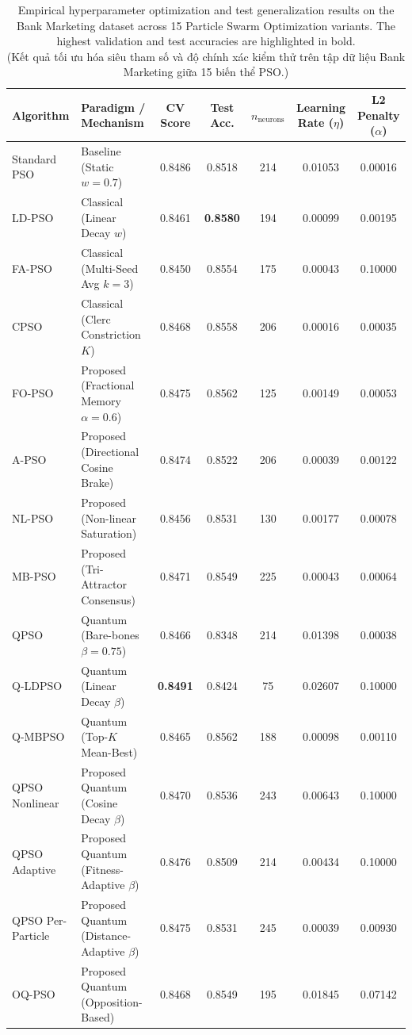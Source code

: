 \begin{table}[htbp]
\centering
\fontsize{8.5pt}{11pt}\selectfont
\caption{Empirical hyperparameter optimization and test generalization results on the Bank Marketing dataset across 15 Particle Swarm Optimization variants. The highest validation and test accuracies are highlighted in bold. \\ (Kết quả tối ưu hóa siêu tham số và độ chính xác kiểm thử trên tập dữ liệu Bank Marketing giữa 15 biến thể PSO.)}
\label{tab:bank_marketing_15algos}
\vspace{3pt}
\begin{tabular}{llccccc}
\hline\hline
\textbf{Algorithm} & \textbf{Paradigm / Mechanism} & \textbf{CV Score} & \textbf{Test Acc.} & \textbf{$n_{\mathrm{neurons}}$} & \textbf{Learning Rate ($\eta$)} & \textbf{L2 Penalty ($\alpha$)} \\
\hline
Standard PSO & Baseline (Static $w=0.7$) & 0.8486 & 0.8518 & 214 & 0.01053 & 0.00016 \\
LD-PSO & Classical (Linear Decay $w$) & 0.8461 & \textbf{0.8580} & 194 & 0.00099 & 0.00195 \\
FA-PSO & Classical (Multi-Seed Avg $k=3$) & 0.8450 & 0.8554 & 175 & 0.00043 & 0.10000 \\
CPSO & Classical (Clerc Constriction $K$) & 0.8468 & 0.8558 & 206 & 0.00016 & 0.00035 \\
\hline
FO-PSO & Proposed (Fractional Memory $\alpha=0.6$) & 0.8475 & 0.8562 & 125 & 0.00149 & 0.00053 \\
A-PSO & Proposed (Directional Cosine Brake) & 0.8474 & 0.8522 & 206 & 0.00039 & 0.00122 \\
NL-PSO & Proposed (Non-linear Saturation) & 0.8456 & 0.8531 & 130 & 0.00177 & 0.00078 \\
MB-PSO & Proposed (Tri-Attractor Consensus) & 0.8471 & 0.8549 & 225 & 0.00043 & 0.00064 \\
\hline
QPSO & Quantum (Bare-bones $\beta=0.75$) & 0.8466 & 0.8348 & 214 & 0.01398 & 0.00038 \\
Q-LDPSO & Quantum (Linear Decay $\beta$) & \textbf{0.8491} & 0.8424 & 75 & 0.02607 & 0.10000 \\
Q-MBPSO & Quantum (Top-$K$ Mean-Best) & 0.8465 & 0.8562 & 188 & 0.00098 & 0.00110 \\
\hline
QPSO Nonlinear & Proposed Quantum (Cosine Decay $\beta$) & 0.8470 & 0.8536 & 243 & 0.00643 & 0.10000 \\
QPSO Adaptive & Proposed Quantum (Fitness-Adaptive $\beta$) & 0.8476 & 0.8509 & 214 & 0.00434 & 0.10000 \\
QPSO Per-Particle & Proposed Quantum (Distance-Adaptive $\beta$) & 0.8475 & 0.8531 & 245 & 0.00039 & 0.00930 \\
OQ-PSO & Proposed Quantum (Opposition-Based) & 0.8468 & 0.8549 & 195 & 0.01845 & 0.07142 \\
\hline\hline
\end{tabular}
\end{table}